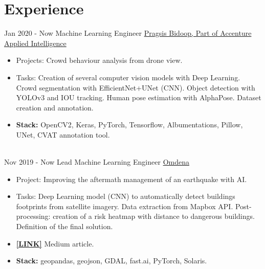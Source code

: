 \documentclass[letterpaper]{twentysecondcv} %
\begin{document}
\makeprofile %




\section{Experience}
\begin{twenty} %

\twentyitem
    	{Jan 2020 - }
		{Now}
        {Machine Learning Engineer}
        {\href{https://pragsis.com/}{Pragsis Bidoop, Part of Accenture Applied Intelligence}}
        {}
        {\begin{itemize}
			\item Projects: Crowd behaviour analysis from drone view.
			\item Tasks: Creation of several computer vision models with Deep Learning. Crowd segmentation with EfficientNet+UNet (CNN). Object detection with YOLOv3 and IOU tracking. Human pose estimation with AlphaPose. Dataset creation and annotation.
			\item \textbf{Stack:} OpenCV2, Keras, PyTorch, Tensorflow, Albumentations, Pillow, UNet, CVAT annotation tool.
        \end{itemize}}
        \\
\twentyitem
    	{Nov 2019 - }
		{Now}
        {Lead Machine Learning Engineer}
        {\href{https://omdena.com}{Omdena}}
        {}
        {\begin{itemize}
			\item Project: Improving the aftermath management of an earthquake with AI.
			\item Tasks: Deep Learning model (CNN) to automatically detect buildings footprints from satellite imagery. Data extraction from Mapbox API. Post-processing: creation of a risk heatmap with distance to dangerous buildings. Definition of the final solution.
			\item {\href{https://medium.com/omdena/estimating-street-safeness-after-an-earthquake-with-deep-learning-f2ae50b9e25e}{\textbf{[LINK]}}} Medium article.
			\item \textbf{Stack:} geopandas, geojson, GDAL, fast.ai, PyTorch, Solaris.

\end{itemize}}
\end{twenty}
\end{document}
